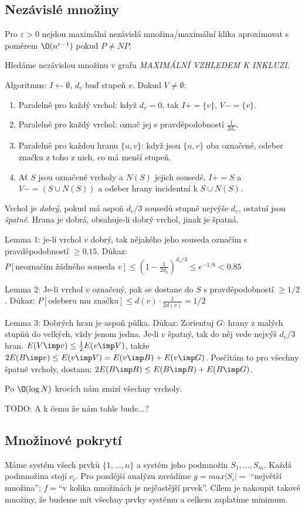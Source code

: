 \documentclass[a4paper,10pt,titlepage]{article} \usepackage[utf8]{inputenc}
\begin{document}
\subsection{Nezávislé množiny}
Pro $\varepsilon>0$ nejdou maximální nezávislá množina/maximální klika
aproximovat s poměrem $\O(n^{\varepsilon-1})$ pokud $P\neq NP$.

Hledáme nezávislou množinu v grafu \emph{MAXIMÁLNÍ VZHLEDEM K INKLUZI}.

Algoritmus: $I\gets\emptyset$, $d_v$ buď stupeň $v$. Dokud $V\neq\emptyset$:
\begin{enumerate}
\item Paralelně pro každý vrchol: když $d_v=0$, tak $I+=\{v\}$, $V-=\{v\}$.
\item Paralelně pro každý vrchol: označ jej s pravděpodobností $\frac{1}{2d_v}$.
\item Paralelně pro každou hranu $\{u,v\}$: když jsou $\{u,v\}$ oba označené,
	odeber značku z toho z nich, co má menší stupeň.
\item Ať $S$ jsou označené vrcholy a $N(S)$ jejich sousedé. $I+=S$ a $V-=(S\cup
	N(S))$ a odeber hrany incidentní k $S\cup N(S)$.
\end{enumerate}

Vrchol je \emph{dobrý}, pokud má aspoň $d_v/3$ sousedů stupně nejvýše $d_v$,
ostatní jsou \emph{špatné}. Hrana je dobrá, obsahuje-li dobrý vrchol, jinak je
špatná.

Lemma 1: je-li vrchol $v$ dobrý, tak nějakého jeho souseda označím s
pravděpodobností $\geq 0.15$.
Důkaz: $P[\text{neoznačím žádného souseda }v]\leq (1-\frac{1}{2d_v})^{d_v/3}\leq
	e^{-1/6}<0.85$

Lemma 2: Je-li vrchol $v$ označený, pak se dostane do $S$ s pravděpodobností
	$\geq 1/2$.
Důkaz: $P[\text{odeberu mu značku}]\leq d(v)\cdot\frac{1}{2d(v)}=1/2$

Lemma 3: Dobrých hran je aspoň půlka.
Důkaz: Zorientuj $G$: hrany z malých stupňů do velkých, vždy jenom jedna.
	Je-li $v$ špatný, tak do něj vede nejvýš $d_v/3$ hran.
	$E(V\imp v)\leq\frac{1}{2}E(v\imp V)$,
	takže $2E(B\imp v)\leq E(v\imp V)=E(v\imp B)+E(v\imp G)$.
	Posčítám to pro všechny špatné vrcholy, dostanu:
	$2E(B\imp B)\leq E(B\imp B)+E(B\imp G)$.

Po $\O(\log N)$ krocích nám zmizí všechny vrcholy.

TODO: A k čemu že nám tohle bude...?

\subsection{Množinové pokrytí}
Máme systém všech prvků $\{1, \ldots, n\}$ a systém jeho podmnožin $S_1, \ldots,
S_m$. Každá podmnožina stojí $c_i$. Pro pozdější analýzu zavádíme $g=max|S_i|=$
``největší množina''; $f=$``v kolika množinách je nejčastější prvek''. Cílem je
nakoupit takové množiny, že budeme mít všechny prvky systému a celkem zaplatíme
minimum.
\end{document}
